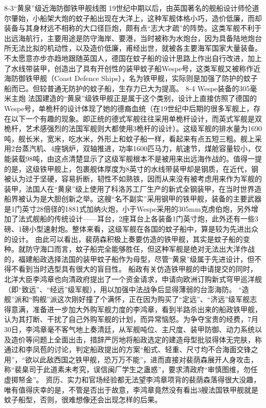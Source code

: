 \documentclass[12pt,UTF8]{ctexbook}
\begin{document}
8-3“黄泉”级近海防御铁甲舰线图
19世纪中期以后，由英国著名的舰船设计师伦道尔肇始，小船架大炮的蚊子船出现在大洋上，这种军舰体格小巧，造价低廉，而却装备与其身材远不相称的大口径巨炮，颇有点“志大才疏”的阵势。这类军舰不利于出远海航行，主要用途是防守海岸、要港，当时被称为水炮台，因为具备陆地炮台所无法比拟的机动性，以及造价低廉，甫经出世，就被各主要海军国家大量装备。不太愿意亦步亦趋地跟随英国人，德国在蚊子船的设计思路上作出自行改进，加上了水线带装甲，创造出了具有开创性的装甲蚊子船Wespe号，这类军舰又被称作近海防御铁甲舰（Coast Defence Ships），名为铁甲舰，实际则是加强了防护的蚊子船而已。但较普通无防护的蚊子船，生存力已大为提高。
8-4 Wespe装备的305毫米主炮
法国建造的“黄泉”级铁甲舰正是属于这个类别，设计上直接仿照了德国的Wespe号，单桅杆的设计体现了她的德裔血统（在19世纪中后期的很多军舰上，存在以下一个有趣的现象。即正统的德式军舰往往采用单桅杆设计，而英式军舰是双桅杆，艺术感强烈的法国军舰则大都使用3桅杆的设计）。这级军舰的排水量为1690吨，舰长米，宽米，吃水米，外形上和蚊子船一样，看起来有点五短三粗。舰上采用2台蒸汽机、4座锅炉，双轴推进，功率1600匹马力，航速节，煤舱容量较小，仅能装载98吨，由这点清楚显示了这级军舰根本不是被用来出远海作战的。值得一提的是，这级铁甲舰上，包裹舰体厚度为8英寸的水线带装甲却是钢质，在近代，钢被认为过于坚硬，容易折断，韧性不如熟铁，因而从来没有被考虑用来作为军舰的装甲，法国人在“黄泉”级上使用了科洛苏工厂生产的新式全钢装甲，在当时世界造船界被认为是大胆创新之举。这艘“名不副实”采用钢甲的铁甲舰，装备的主要武器是1门英寸28倍径的1881式加纳火炮，小于Wespe采用的305mm克虏伯炮，另外增加了法式舰船的传统设计——耳台，2座耳台上各装备1门英寸炮，此外还有一些3磅、1磅小型速射炮。整体来看，这级军舰在各国的蚊子船中，算是较为先进出众的设计。
由此可以看出，裴荫森积极上奏要仿造的铁甲舰，其实是蚊子船的变种。就防守海口而言，蚊子船完全能够胜任，但这种军舰是绝对无法出大洋作战的，福建船政选择法国的装甲蚊子船作为母型，尽管“黄泉”级属于先进设计，但不得不看到当时选型具有很大的盲目性。
船政有关仿造铁甲舰的申请提交的同时，北洋大臣李鸿章也向清政府提出了一个资金请求，申请向欧洲订购新式穹甲巡洋舰（即“致远”、“经远”级军舰），用以加强中法战争后显得薄弱的台澎海防。 “造舰”派和“购舰”派这次刚好撞了个满怀，正在因为购买了“定远”、“济远”级军舰志得意满，准备进一步加大外购军舰力度的李鸿章，看到半路杀出来的船政铁甲舰，认为其打断、干扰了自己外购军舰的计划，而异常恼怒。为争夺宝贵的经费，7月30日，李鸿章毫不客气地上奏清廷，从军舰吨位、主尺度、装甲防御、动力系统以及造价等问题上全面出击，措辞严厉地将船政选定的建造母型批驳得体无完肤，称通过和李凤苞的讨论，判定船政提出的方案“船式、轻重、尺寸均不合海面交锋之用”，“欲以此敌西国之铁甲舰，恐万万不能”，进而直接对裴荫森展开人身攻击，称“裴臬司于此道素未考究，误信闽厂学生之蛊惑”，要求清政府“审慎图维，勿任虚掷帑金”。 资历、实力和官场经验都无法望李鸿章项背的裴荫森落得很大没趣，唯有值得庆幸的是，不管是否出于故意，李鸿章竟然没有看出3艘法国铁甲舰就是蚊子船型，否则，很难想像还会出现怎样的后果。
\end{document}
